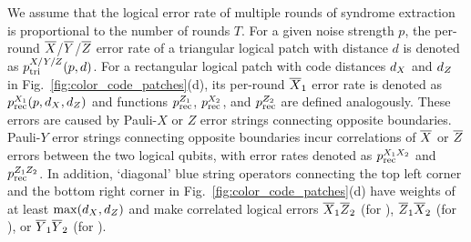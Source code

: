 \documentclass[
 prx,
 reprint,
 superscriptaddress,
 longbibliography,
 dvipsnames
]{revtex4-2}
\begin{document}
We assume that the logical error rate of multiple rounds of syndrome extraction is proportional to the number of rounds $T$.
For a given noise strength $p$, the per-round $\overline{X}$/$\overline{Y}$/$\overline{Z}$ error rate of a triangular logical patch with distance $d$ is denoted as $p_{\mathrm{tri}}^{X/Y/Z}(p, d)$.
For a rectangular logical patch with code distances ${d_X}$ and ${d_Z}$ in Fig.~\ref{fig:color_code_patches}(d), its per-round $\overline{X}_1$ error rate is denoted as $p_{\mathrm{rec}}^{X_1}(p, {d_X}, {d_Z})$ and functions $p_{\mathrm{rec}}^{Z_1}$, $p_{\mathrm{rec}}^{X_2}$, and $p_{\mathrm{rec}}^{Z_2}$ are defined analogously.
These errors are caused by Pauli-$X$ or $Z$ error strings connecting opposite boundaries.
Pauli-$Y$ error strings connecting opposite boundaries incur correlations of $\overline{X}$ or $\overline{Z}$ errors between the two logical qubits, with error rates denoted as $p_{\mathrm{rec}}^{X_1 X_2}$ and $p_{\mathrm{rec}}^{Z_1 Z_2}$.
In addition, `diagonal' blue string operators connecting the top left corner and the bottom right corner in Fig.~\ref{fig:color_code_patches}(d) have weights of at least $\max({d_X}, {d_Z})$ and make correlated logical errors $\overline{X}_1 \overline{Z}_2$ (for \bx), $\overline{Z}_1 \overline{X}_2$ (for \bz), or $\overline{Y}_1 \overline{Y}_2$ (for \by).
\end{document}
